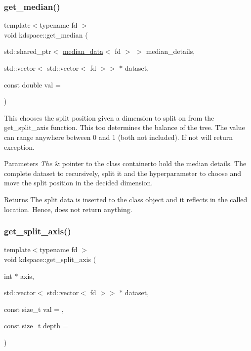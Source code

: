 \subsubsection{\texorpdfstring{get\+\_\+median()}{get\_median()}}
{\footnotesize\ttfamily template$<$typename fd $>$ \\
void kdspace\+::get\+\_\+median (\begin{DoxyParamCaption}\item[{std\+::shared\+\_\+ptr$<$ \hyperlink{classkdspace_1_1median__data}{median\+\_\+data}$<$ fd $>$ $>$}]{median\+\_\+details,  }\item[{std\+::vector$<$ std\+::vector$<$ fd $>$$>$ $\ast$}]{dataset,  }\item[{const double}]{val = {} }\end{DoxyParamCaption})}



This chooses the split position given a dimension to split on from the \textquotesingle{}get\+\_\+split\+\_\+axis\textquotesingle{} function. This too determines the balance of the tree. The value can range anywhere between 0 and 1 (both not included). If not will return exception. 


\begin{DoxyParams}{Parameters}
{\em The} & pointer to the class containerto hold the median details. The complete dataset to recursively, split it and the hyperparameter to choose and move the split position in the decided dimension. \\
\hline
\end{DoxyParams}
\begin{DoxyReturn}{Returns}
The split data is inserted to the class object and it reflects in the called location. Hence, does not return anything. 
\end{DoxyReturn}
\mbox{\label{namespacekdspace_a4b05e61a7246f9455a62996475eb7bf2}} 
\subsubsection{\texorpdfstring{get\+\_\+split\+\_\+axis()}{get\_split\_axis()}}
{\footnotesize\ttfamily template$<$typename fd $>$ \\
void kdspace\+::get\+\_\+split\+\_\+axis (\begin{DoxyParamCaption}\item[{int $\ast$}]{axis,  }\item[{std\+::vector$<$ std\+::vector$<$ fd $>$$>$ $\ast$}]{dataset,  }\item[{const size\+\_\+t}]{val = {},  }\item[{const size\+\_\+t}]{depth = {} }\end{DoxyParamCaption})}



